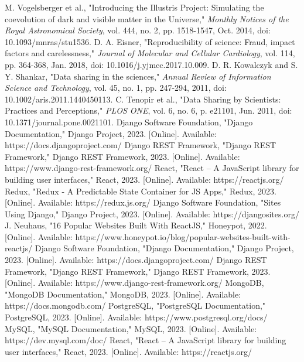 \documentclass[conference]{IEEEtran}
\begin{document}
\begin{thebibliography}{00}
 M. Vogelsberger et al., "Introducing the Illustris Project: Simulating the coevolution of dark and visible matter in the Universe," \textit{Monthly Notices of the Royal Astronomical Society}, vol. 444, no. 2, pp. 1518-1547, Oct. 2014, doi: 10.1093/mnras/stu1536.
 D. A. Eisner, "Reproducibility of science: Fraud, impact factors and carelessness," \textit{Journal of Molecular and Cellular Cardiology}, vol. 114, pp. 364-368, Jan. 2018, doi: 10.1016/j.yjmcc.2017.10.009.
 D. R. Kowalczyk and S. Y. Shankar, "Data sharing in the sciences," \textit{Annual Review of Information Science and Technology}, vol. 45, no. 1, pp. 247-294, 2011, doi: 10.1002/aris.2011.1440450113.
 C. Tenopir et al., "Data Sharing by Scientists: Practices and Perceptions," \textit{PLOS ONE}, vol. 6, no. 6, p. e21101, Jun. 2011, doi: 10.1371/journal.pone.0021101.
 Django Software Foundation, "Django Documentation," Django Project, 2023. [Online]. Available: https://docs.djangoproject.com/
 Django REST Framework, "Django REST Framework," Django REST Framework, 2023. [Online]. Available: https://www.django-rest-framework.org/
 React, "React – A JavaScript library for building user interfaces," React, 2023. [Online]. Available: https://reactjs.org/
 Redux, "Redux - A Predictable State Container for JS Apps," Redux, 2023. [Online]. Available: https://redux.js.org/
 Django Software Foundation, "Sites Using Django," Django Project, 2023. [Online]. Available: https://djangosites.org/
 J. Neuhaus, "16 Popular Websites Built With ReactJS," Honeypot, 2022. [Online]. Available: https://www.honeypot.io/blog/popular-websites-built-with-reactjs/
 Django Software Foundation, "Django Documentation," Django Project, 2023. [Online]. Available: https://docs.djangoproject.com/
 Django REST Framework, "Django REST Framework," Django REST Framework, 2023. [Online]. Available: https://www.django-rest-framework.org/
 MongoDB, "MongoDB Documentation," MongoDB, 2023. [Online]. Available: https://docs.mongodb.com/
 PostgreSQL, "PostgreSQL Documentation," PostgreSQL, 2023. [Online]. Available: https://www.postgresql.org/docs/
 MySQL, "MySQL Documentation," MySQL, 2023. [Online]. Available: https://dev.mysql.com/doc/
 React, "React – A JavaScript library for building user interfaces," React, 2023. [Online]. Available: https://reactjs.org/

\end{thebibliography}
\end{document}
